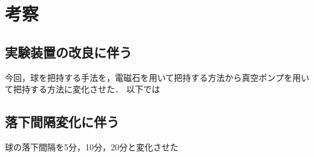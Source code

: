 \section{考察}

\subsection{実験装置の改良に伴う}

今回，球を把持する手法を，電磁石を用いて把持する方法から真空ポンプを用いて把持する方法に変化させた．
以下では

\subsection{落下間隔変化に伴う}

球の落下間隔を5分，10分，20分と変化させた